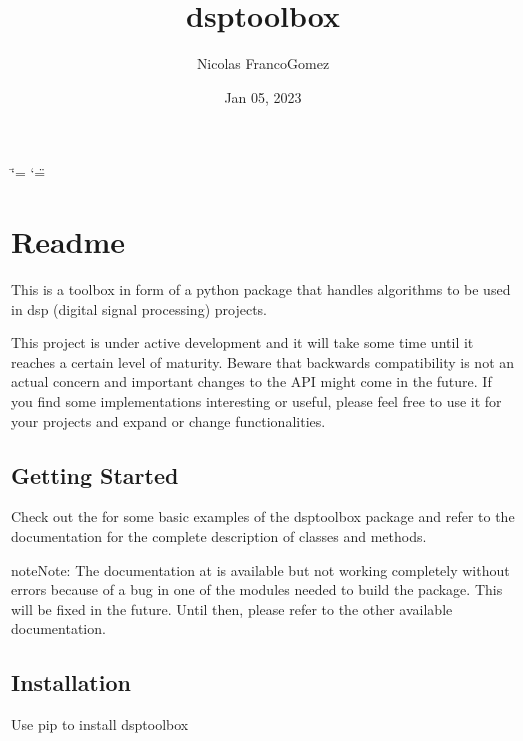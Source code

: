 \documentclass[letterpaper,10pt,english]{sphinxmanual}
\title{dsptoolbox}
\date{Jan 05, 2023}
\author{Nicolas Franco\sphinxhyphen{}Gomez}
\let\sphinxpxdimen\pdfpxdimen\else\newdimen\sphinxpxdimen
\begin{document}
\ifdefined\shorthandoff
  \ifnum\catcode`\=\string=\active\shorthandoff{=}\fi
  \ifnum\catcode`\"=\active{}\fi
\fi

\pagestyle{empty}
\sphinxmaketitle
\pagestyle{plain}
\sphinxtableofcontents
\pagestyle{normal}
\label{\detokenize{index::doc}}
\sphinxAtStartPar
\sphinxincludegraphics[width=700\sphinxpxdimen]{{logo}.png}



\sphinxstepscope


\chapter{Readme}
\label{\detokenize{readme:readme}}\label{\detokenize{readme::doc}}
\sphinxAtStartPar
This is a toolbox in form of a python package that handles algorithms to be used in dsp (digital signal processing) projects.

\sphinxAtStartPar
This project is under active development and it will take some time until it reaches a certain level of maturity. Beware that backwards compatibility is not an actual concern and important changes to the API might come in the future. If you find some implementations interesting or useful, please feel free to use it for your projects and expand or change
functionalities.


\section{Getting Started}
\label{\detokenize{readme:getting-started}}
\sphinxAtStartPar
Check out the  for some basic examples of the dsptoolbox package
and refer to the documentation for the complete description of classes and methods.

\begin{sphinxadmonition}{note}{Note:}
\sphinxAtStartPar
The documentation at  is available but not working completely without errors
because of a bug in one of the modules needed to build the package. This will be fixed in the future.
Until then, please refer to the other available documentation.
\end{sphinxadmonition}


\section{Installation}
\label{\detokenize{readme:installation}}
\sphinxAtStartPar
Use pip to install dsptoolbox
\end{document}
